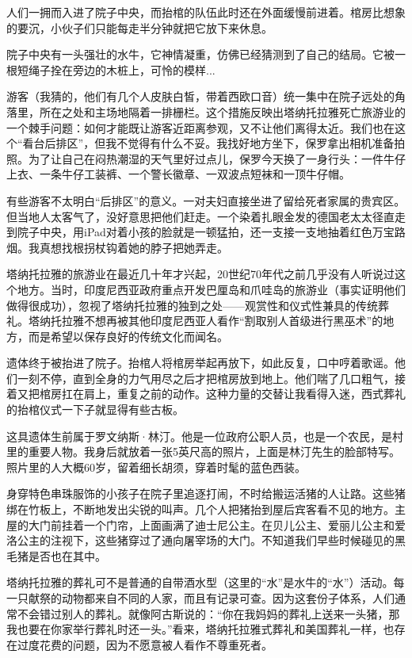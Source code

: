 \documentclass[12pt,oneside]{book}
\begin{document}
\begin{bookref}[frametitle={\cite{好好告别}}]
人们一拥而入进了院子中央，而抬棺的队伍此时还在外面缓慢前进着。棺房比想象的要沉，小伙子们只能每走半分钟就把它放下来休息。

院子中央有一头强壮的水牛，它神情凝重，仿佛已经猜测到了自己的结局。它被一根短绳子拴在旁边的木桩上，可怜的模样...

游客（我猜的，他们有几个人皮肤白皙，带着西欧口音）统一集中在院子远处的角落里，所在之处和主场地隔着一排栅栏。这个措施反映出塔纳托拉雅死亡旅游业的一个棘手问题：如何才能既让游客近距离参观，又不让他们离得太近。我们也在这个“看台后排区”，但我不觉得有什么不妥。我找好地方坐下，保罗拿出相机准备拍照。为了让自己在闷热潮湿的天气里好过点儿，保罗今天换了一身行头：一件牛仔上衣、一条牛仔工装裤、一个警长徽章、一双波点短袜和一顶牛仔帽。

有些游客不太明白“后排区”的意义。一对夫妇直接坐进了留给死者家属的贵宾区。但当地人太客气了，没好意思把他们赶走。一个染着扎眼金发的德国老太太径直走到院子中央，用iPad对着小孩的脸就是一顿猛拍，还一支接一支地抽着红色万宝路烟。我真想找根拐杖钩着她的脖子把她弄走。

塔纳托拉雅的旅游业在最近几十年才兴起，20世纪70年代之前几乎没有人听说过这个地方。当时，印度尼西亚政府重点开发巴厘岛和爪哇岛的旅游业（事实证明他们做得很成功），忽视了塔纳托拉雅的独到之处——观赏性和仪式性兼具的传统葬礼。塔纳托拉雅不想再被其他印度尼西亚人看作“割取别人首级进行黑巫术”的地方，而是希望以保存良好的传统文化而闻名。

遗体终于被抬进了院子。抬棺人将棺房举起再放下，如此反复，口中哼着歌谣。他们一刻不停，直到全身的力气用尽之后才把棺房放到地上。他们喘了几口粗气，接着又把棺房扛在肩上，重复之前的动作。这种力量的交替让我看得入迷，西式葬礼的抬棺仪式一下子就显得有些古板。

这具遗体生前属于罗文纳斯·林汀。他是一位政府公职人员，也是一个农民，是村里的重要人物。我身后就放着一张5英尺高的照片，上面是林汀先生的脸部特写。照片里的人大概60岁，留着细长胡须，穿着时髦的蓝色西装。

身穿特色串珠服饰的小孩子在院子里追逐打闹，不时给搬运活猪的人让路。这些猪绑在竹板上，不断地发出尖锐的叫声。几个人把猪抬到屋后宾客看不见的地方。主屋的大门前挂着一个门帘，上面画满了迪士尼公主。在贝儿公主、爱丽儿公主和爱洛公主的注视下，这些猪穿过了通向屠宰场的大门。不知道我们早些时候碰见的黑毛猪是否也在其中。

塔纳托拉雅的葬礼可不是普通的自带酒水型（这里的“水”是水牛的“水”）活动。每一只献祭的动物都来自不同的人家，而且有记录可查。因为这套份子体系，人们通常不会错过别人的葬礼。就像阿古斯说的：“你在我妈妈的葬礼上送来一头猪，那我也要在你家举行葬礼时还一头。”看来，塔纳托拉雅式葬礼和美国葬礼一样，也存在过度花费的问题，因为不愿意被人看作不尊重死者。


\end{bookref}
\end{document}
